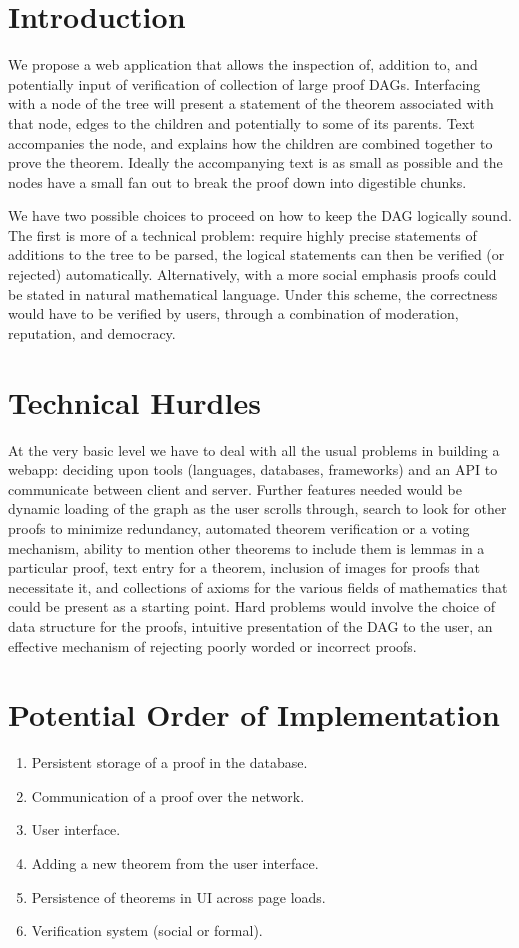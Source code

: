 \documentclass{acm_proc_article-sp}
\begin{document}
\section{Introduction}
We propose a web application that allows the inspection of, addition to, and
potentially input of verification of collection of large proof DAGs.
Interfacing with a node of the tree will present a statement of the theorem
associated with that node, edges to the children and potentially to some of its
parents. Text accompanies the node, and explains how the children are combined
together to prove the theorem. Ideally the accompanying text is as small as
possible and the nodes have a small fan out to break the proof down into
digestible chunks.

We have two possible choices to proceed on how to keep the DAG logically sound.
The first is more of a technical problem: require highly precise statements of
additions to the tree to be parsed, the logical statements can then be verified
(or rejected) automatically. Alternatively, with a more social emphasis proofs
could be stated in natural mathematical language. Under this scheme, the
correctness would have to be verified by users, through a combination
of moderation, reputation, and democracy.

\section{Technical Hurdles}
At the very basic level we have to deal with all the usual problems in
building a webapp: deciding upon tools (languages, databases, frameworks)
and an API to communicate between client and server. Further features
needed would be dynamic loading of the graph as the user scrolls through,
search to look for other proofs to minimize redundancy, automated theorem
verification or a voting mechanism, ability to mention other theorems
to include them is lemmas in a particular proof, text entry for a theorem,
inclusion of images for proofs that necessitate it, and collections of
axioms for the various fields of mathematics that could be present as
a starting point. Hard problems would involve the choice of data 
structure for the proofs, intuitive presentation of the DAG to the user,
an effective mechanism of rejecting poorly worded or incorrect proofs.

\section{Potential Order of Implementation}
\begin{enumerate}
    \item Persistent storage of a proof in the database.
    \item Communication of a proof over the network.
    \item User interface.
    \item Adding a new theorem from the user interface.
    \item Persistence of theorems in UI across page loads.
    \item Verification system (social or formal). 
\end{enumerate}
\end{document}
